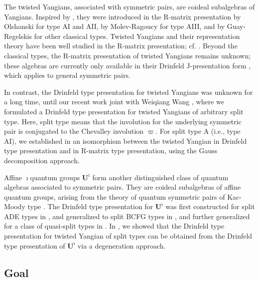\documentclass[11pt,reqno]{amsart}
\numberwithin{equation}{section}
\theoremstyle{definition}
\theoremstyle{remark}
\newcommand{\g}{\mathfrak{g}}
\newcommand{\id}{{\mathrm{id}}}
\def \Ui{\mathbf{U}^\imath}
\def \a{\mathfrak{a}}
\begin{document}
The twisted Yangians, associated with symmetric pairs, are coideal subalgebras of Yangians. Inspired by \cite{Ch84,Sk88}, they were introduced in the R-matrix presentation by Olshanski \cite{Ol92} for type AI and AII, by Molev-Ragoucy \cite{MR02} for type AIII, and by Guay-Regelskis \cite{GR16} for other classical types. Twisted Yangians and their representation theory have been well studied in the R-matrix presentation; cf. \cite{MNO96,Na04,Mol07,GRW17}. Beyond the classical types, the R-matrix presentation of twisted Yangians remains unknown; these algebras are currently only available in their Drinfeld J-presentation form \cite{Ma02, BR17}, which applies to general symmetric pairs.

In contrast, the Drinfeld type presentation for twisted Yangians was unknown for a long time, until our recent work joint with Weiqiang Wang \cite{KLWZ23a,KLWZ23b}, where we formulated a  Drinfeld type presentation for twisted Yangians of arbitrary split type. Here, split type means that the involution for the underlying symmetric pair is conjugated to the Chevalley involution $\varpi$. For split type A (i.e., type AI), we established in \cite{KLWZ23a} an isomorphism between the twisted Yangian in Drinfeld type presentation and in R-matrix type presentation, using the Gauss decomposition approach. 

Affine $\imath$quantum groups $\Ui$ form another distinguished class of quantum algebras associated to symmetric pairs. They are coideal subalgebras of affine quantum groups, arising from the theory of quantum symmetric pairs of Kac-Moody type \cite{Ko14}. The Drinfeld type presentation for $\Ui$ was first constructed for split ADE types in \cite{LW21}, and generalized to split BCFG types in \cite{Z22}, and further generalized for a class of quasi-split types in \cite{LWZ23a,LWZ23b}. In \cite{KLWZ23b}, we showed that the Drinfeld type presentation for twisted Yangian of split types can be obtained from the Drinfeld type presentation of $\Ui$ via a degeneration approach. 

\subsection{Goal}
\end{document}

